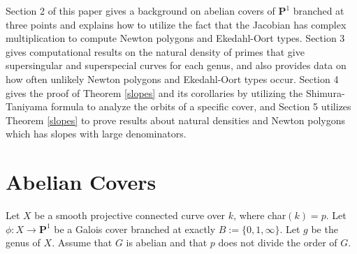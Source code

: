\documentclass{article}
\theoremstyle{remark}
\theoremstyle{definition}
\begin{document}
\par Section 2 of this paper gives a background on abelian covers of $\mathbf{P}^1$ branched at three points and explains how to utilize the fact that the Jacobian has complex multiplication to compute Newton polygons and Ekedahl-Oort types. Section 3 gives computational results on the natural density of primes that give supersingular and superspecial curves for each genus, and also provides data on how often unlikely Newton polygons and Ekedahl-Oort types occur. Section 4 gives the proof of Theorem \ref{slopes} and its corollaries by utilizing the Shimura-Taniyama formula to analyze the orbits of a specific cover, and Section 5 utilizes Theorem \ref{slopes} to prove results about natural densities and Newton polygons which has slopes with large denominators.
\section{Abelian Covers}

\par \hspace{\parindent} Let $X$ be a smooth projective connected curve over $k$, where char$(k) = p$. Let $\phi: X \to \mathbf{P}^1$ be a Galois cover branched at exactly $B := \{0,1,\infty\}$. Let $g$ be the genus of $X$. Assume that $G$ is abelian and that $p$ does not divide the order of $G$.
\end{document}
